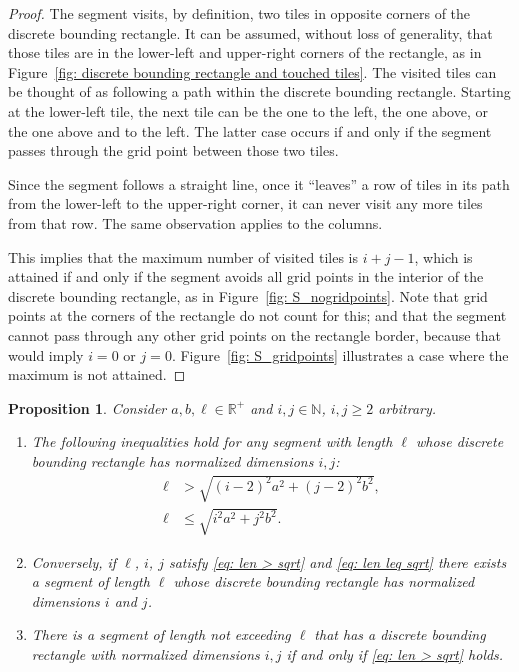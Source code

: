 \documentclass[12pt, a4paper]{article}
\newcommand{\len}{\ell} %
\newtheorem{proposition}{Proposition}%
\begin{document}
\begin{proof}
The segment visits, by definition, two tiles in opposite corners of the discrete bounding rectangle. It can be assumed, without loss of generality, that those tiles are in the lower-left and upper-right corners of the rectangle, as in Figure~\ref{fig: discrete bounding rectangle and touched tiles}. The visited tiles can be thought of as following a path within the discrete bounding rectangle. Starting at the lower-left tile, the next tile can be the one to the left, the one above, or the one above and to the left. The latter case occurs if and only if the segment passes through the grid point between those two tiles.

Since the segment follows a straight line, once it ``leaves'' a row of tiles in its path from the lower-left to the upper-right corner, it can never visit any more tiles from that row. The same observation applies to the columns.

This implies that the maximum number of visited tiles is $i+j-1$, which is attained if and only if the segment avoids all grid points in the interior of the discrete bounding rectangle, as in Figure~\ref{fig: S_nogridpoints}. Note that grid points at the corners of the rectangle do not count for this; and that the segment cannot pass through any other grid points on the rectangle border, because that would imply $i=0$ or $j=0$. Figure~\ref{fig: S_gridpoints} illustrates a case where the maximum is not attained.
\end{proof}

\begin{proposition}
\label{prop: len ineq i j}
Consider $a, b, \len \in \mathbb R^+$ and $i, j \in \mathbb N$, $i, j \geq 2$ arbitrary.
\begin{enumerate}
\item
\label{prop: len ineq i j: ineqs}
The following inequalities hold for any segment with length $\len$ whose discrete bounding rectangle has normalized dimensions $i, j$:
\begin{align}
\label{eq: len > sqrt}
\len &> \sqrt{(i-2)^2 a^2 + (j-2)^2 b^2}, \\
\label{eq: len leq sqrt}
\len &\leq \sqrt{i^2 a^2 + j^2 b^2}.
\end{align}
\item
\label{prop: len ineq i j: exist}
Conversely, if $\len$, $i$, $j$ satisfy \eqref{eq: len > sqrt} and \eqref{eq: len leq sqrt} there exists a segment of length $\len$ whose discrete bounding rectangle has normalized dimensions $i$ and $j$.
\item
\label{prop: len ineq i j: ineq, exist}
There is a segment of length not exceeding $\len$ that has a discrete bounding rectangle with normalized dimensions $i, j$ if and only if \eqref{eq: len > sqrt} holds.
\end{enumerate}
\end{proposition}
\end{document}

